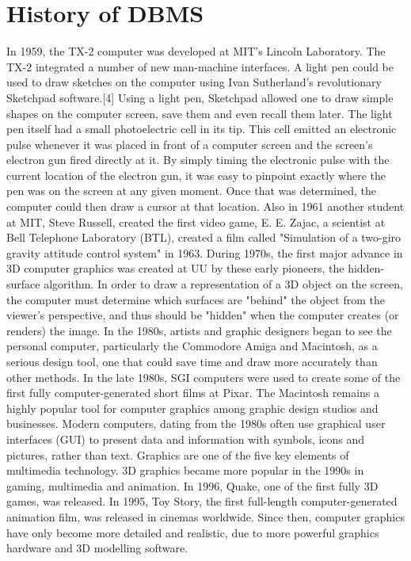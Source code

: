 \section{History of DBMS }
In 1959, the TX-2 computer was developed at MIT's Lincoln Laboratory. The TX-2 integrated a number of new man-machine interfaces. A light pen could be used to draw sketches on the computer using Ivan Sutherland's revolutionary Sketchpad software.[4] Using a light pen, Sketchpad allowed one to draw simple shapes on the computer screen, save them and even recall them later. The light pen itself had a small photoelectric cell in its tip. This cell emitted an electronic pulse whenever it was placed in front of a computer screen and the screen's electron gun fired directly at it. By simply timing the electronic pulse with the current location of the electron gun, it was easy to pinpoint exactly where the pen was on the screen at any given moment. Once that was determined, the computer could then draw a cursor at that location. Also in 1961 another student at MIT, Steve Russell, created the first video game, E. E. Zajac, a scientist at Bell Telephone Laboratory (BTL), created a film called "Simulation of a two-giro gravity attitude control system" in 1963. 
During 1970s, the first major advance in 3D computer graphics was created at UU by these early pioneers, the hidden-surface algorithm. In order to draw a representation of a 3D object on the screen, the computer must determine which surfaces are "behind" the object from the viewer's perspective, and thus should be "hidden" when the computer creates (or renders) the image. 
In the 1980s, artists and graphic designers began to see the personal computer, particularly the Commodore Amiga and Macintosh, as a serious design tool, one that could save time and draw more accurately than other methods. In the late 1980s, SGI computers were used to create some of the first fully computer-generated short films at Pixar. The Macintosh remains a highly popular tool for computer graphics among graphic design studios and businesses. Modern computers, dating from the 1980s often use graphical user interfaces (GUI) to present data and information with symbols, icons and pictures, rather than text. Graphics are one of the five key elements of multimedia technology. 
3D graphics became more popular in the 1990s in gaming, multimedia and animation. In 1996, Quake, one of the first fully 3D games, was released. In 1995, Toy Story, the first full-length computer-generated animation film, was released in cinemas worldwide. Since then, computer graphics have only become more detailed and realistic, due to more powerful graphics hardware and 3D modelling software.

